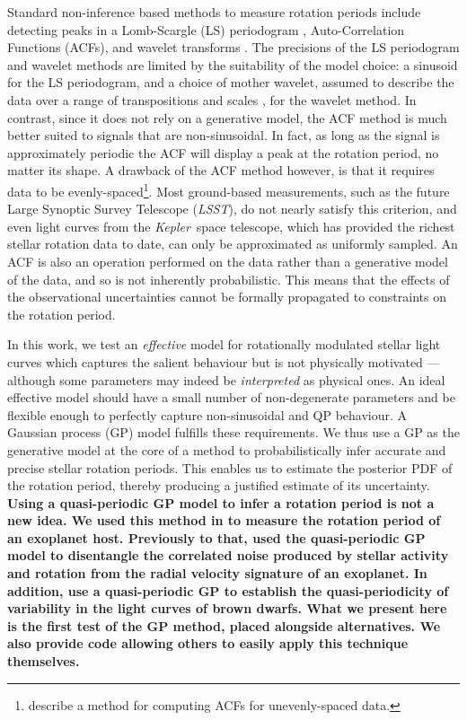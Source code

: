 \documentclass[a4paper,fleqn,usenatbib,useAMS]{mnras}
\newcommand{\Kepler}{{\it Kepler}}
\newcommand{\LSST}{{\it LSST}}
\newcommand{\eg}{{\it e.g.}}
\begin{document}
Standard non-inference based methods to measure rotation periods include
detecting peaks in a Lomb-Scargle \citep{Lomb1976, Scargle1982} (LS)
periodogram \citep[\eg][]{Reinhold2013}, Auto-Correlation Functions (ACFs),
\citep[\eg][]{Mcquillan13b} and wavelet transforms \citep[\eg][]{Garcia2014}.
The precisions of the LS periodogram and wavelet methods are limited by the
suitability of the model choice: a sinusoid for the LS periodogram, and a
choice of mother wavelet, assumed to describe the data over a range of
transpositions and scales \citep[see, \eg][]{Carter2010}, for the wavelet
method.
In contrast, since it does not rely on a generative model, the ACF method is
much better suited to signals that are non-sinusoidal.
In fact, as long as the signal is approximately periodic the ACF will
display a peak at the rotation period, no matter its shape.
A drawback of the ACF method however, is that it requires data to be
evenly-spaced\footnote{\citet{Edelson1988} describe a method for computing
ACFs for unevenly-spaced data.}.
Most ground-based measurements, such as the future Large Synoptic Survey
Telescope (\LSST), do not nearly satisfy this criterion, and even
light curves from the \Kepler\ space telescope, which has provided the richest
stellar rotation data to date, can only be approximated as uniformly sampled.
An ACF is also an operation performed on the data rather than a generative
model of the data, and so is not inherently probabilistic.
This means that the effects of the observational uncertainties cannot be
formally propagated to constraints on the rotation period.

In this work, we test an {\it effective} model for rotationally modulated
stellar light curves which captures the salient behaviour but is not
physically motivated --- although some parameters may indeed be {\it
interpreted} as physical ones.
An ideal effective model should have a small number of non-degenerate
parameters and be flexible enough to perfectly capture non-sinusoidal and QP
behaviour.
A Gaussian process (GP) model fulfills these requirements. We thus use a GP
as the generative model at the core of a method to probabilistically
infer accurate and precise stellar rotation periods.
This enables us to estimate the posterior PDF of the rotation period, thereby
producing a justified estimate of its uncertainty.
{\bf Using a quasi-periodic GP model to infer a rotation period is not a new idea.
We used this method in \citet{Vanderburg2015} to measure the rotation period
of an exoplanet host.
Previously to that, \citet{Haywood2014} used the quasi-periodic GP model
to disentangle the correlated noise produced by stellar activity and rotation
from the radial velocity signature of an exoplanet.
In addition, \citet{Littlefair2017} use a quasi-periodic GP to establish the
quasi-periodicity of variability in the light curves of brown dwarfs.
What we present here is the first test of the GP method, placed alongside
alternatives.
We also provide code allowing others to easily apply this technique
themselves.}
\end{document}
